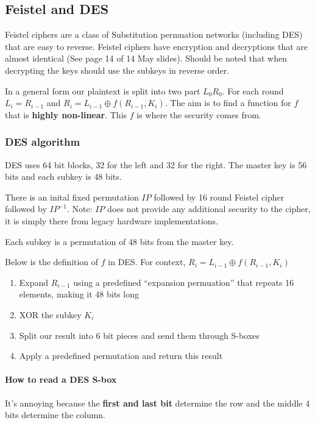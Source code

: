 \documentclass{report}
\begin{document}
\subsection{Feistel and DES}
Feistel ciphers are a class of Substitution permuation networks (including
DES) that are easy to reverse. Feistel ciphers have encryption and decryptions
that are almost identical (See page 14 of 14 May slides). Should be noted
that when decrypting the keys should use the subkeys in reverse order.

In a general form our plaintext is split into two part $L_0 R_0$.
For each round $L_i = R_{i-1}$ and $R_i = L_{i-1} \oplus f(R_{i-1}, K_i)$.
The aim is to find a function for $f$ that is \textbf{highly non-linear}.
This $f$ is where the security comes from.

\subsubsection{DES algorithm}
DES uses 64 bit blocks, 32 for the left and 32 for the right.
The master key is 56 bits and each subkey is 48 bits.

There is an inital fixed permutation $IP$ followed by 16 round Feistel cipher
followed by $IP^{-1}$. Note: $IP$ does not provide any additional security to
the cipher, it is simply there from legacy hardware implementations.

Each subkey is a permutation of 48 bits from the master key.

Below is the definition of $f$ in DES\@. For context,
$R_i = L_{i-1} \oplus f(R_{i-1}, K_i)$
\begin{enumerate}
    \item Expand $R_{i-1}$ using a predefined ``expansion permuation'' that
        repeats 16 elements, making it 48 bits long
    \item XOR the subkey $K_i$
    \item Split our result into 6 bit pieces and send them through S-boxes
    \item Apply a predefined permutation and return this result
\end{enumerate}

\paragraph{How to read a DES S-box}
It's annoying because the \textbf{first and last bit} determine the row
and the middle 4 bits determine the column.
\end{document}
